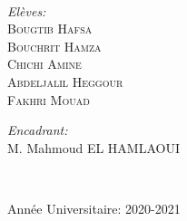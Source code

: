 \begin{titlepage}
\begin{center}
\HRule \\[1.5cm]
\vspace{3cm}
\begin{minipage}{0.4\textwidth}
\begin{flushleft} \large
\emph{Elèves:}\\
\textsc{Bougtib Hafsa }\\
\textsc{Bouchrit Hamza }\\
\textsc{Chichi Amine }\\
\textsc{Abdeljalil Heggour}\\
\textsc{Fakhri Mouad}\\
\end{flushleft}
\end{minipage}
\begin{minipage}{0.4\textwidth}
\begin{flushright} \large
\emph{Encadrant:} \\
M. Mahmoud \textsc{EL HAMLAOUI}\\
\end{flushright}\\
\end{minipage}
\newline
\vspace{5cm}
{\large Année Universitaire: 2020-2021}

\end{center}
\end{titlepage}